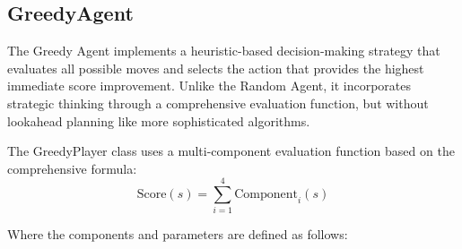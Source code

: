 \documentclass{article}
\begin{document}
\subsection{GreedyAgent}

The Greedy Agent implements a heuristic-based decision-making strategy that evaluates all possible moves and selects the action that provides the highest immediate score improvement. Unlike the Random Agent, it incorporates strategic thinking through a comprehensive evaluation function, but without lookahead planning like more sophisticated algorithms.

The GreedyPlayer class uses a multi-component evaluation function based on the comprehensive formula:
$$\text{Score}(s) = \sum_{i=1}^{4} \text{Component}_i(s)$$

Where the components and parameters are defined as follows:
\end{document}
